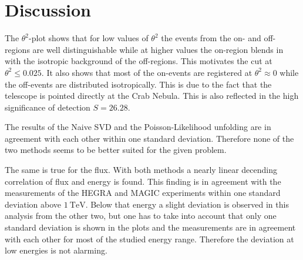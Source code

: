 \section{Discussion}
\label{sec:Diskussion}

The $\theta^2$-plot shows that for low values of $\theta^2$ the events from the on- and off-regions are well distinguishable while at higher values the on-region blends in with the isotropic background of the off-regions. This motivates the cut at $\theta^2 \leq \num{0.025}$. It also shows that most of the on-events are registered at $\theta^2 \approx 0$ while the off-events are distributed isotropically. This is due to the fact that the telescope is pointed directly at the Crab Nebula. This is also reflected in the high significance of detection $S = \num{26.28}$.

The results of the Naive SVD and the Poisson-Likelihood unfolding are in agreement with each other within one standard deviation. Therefore none of the two methods seems to be better suited for the given problem.

The same is true for the flux. With both methods a nearly linear decending correlation of flux and energy is found. This finding is in agreement with the measurements of the HEGRA and MAGIC experiments within one standard deviation above $\SI{1}{\tera\eV}$. Below that energy a slight deviation is observed in this analysis from the other two, but one has to take into account that only one standard deviation is shown in the plots and the measurements are in agreement with each other for most of the studied energy range. Therefore the deviation at low energies is not alarming.
